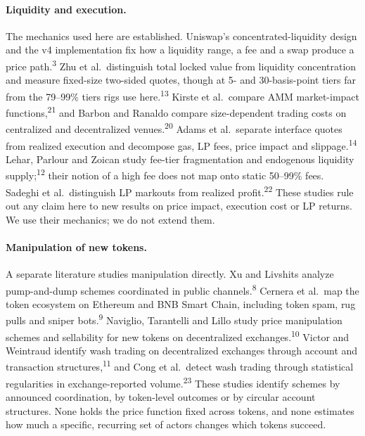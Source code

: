 \documentclass{ledger}
\newcommand{\n}[1]{\textsuperscript{#1}}
\begin{document}
\paragraph{Liquidity and execution.} The mechanics used here are established. Uniswap's concentrated-liquidity design and the v4 implementation fix how a liquidity range, a fee and a swap produce a price path.\n{3} Zhu et al.\ distinguish total locked value from liquidity concentration and measure fixed-size two-sided quotes, though at 5- and 30-basis-point tiers far from the 79--99\% tiers rigs use here.\n{13} Kirste et al.\ compare AMM market-impact functions,\n{21} and Barbon and Ranaldo compare size-dependent trading costs on centralized and decentralized venues.\n{20} Adams et al.\ separate interface quotes from realized execution and decompose gas, LP fees, price impact and slippage.\n{14} Lehar, Parlour and Zoican study fee-tier fragmentation and endogenous liquidity supply;\n{12} their notion of a high fee does not map onto static 50--99\% fees. Sadeghi et al.\ distinguish LP markouts from realized profit.\n{22} These studies rule out any claim here to new results on price impact, execution cost or LP returns. We use their mechanics; we do not extend them.

\paragraph{Manipulation of new tokens.} A separate literature studies manipulation directly. Xu and Livshits analyze pump-and-dump schemes coordinated in public channels.\n{8} Cernera et al.\ map the token ecosystem on Ethereum and BNB Smart Chain, including token spam, rug pulls and sniper bots.\n{9} Naviglio, Tarantelli and Lillo study price manipulation schemes and sellability for new tokens on decentralized exchanges.\n{10} Victor and Weintraud identify wash trading on decentralized exchanges through account and transaction structures,\n{11} and Cong et al.\ detect wash trading through statistical regularities in exchange-reported volume.\n{23} These studies identify schemes by announced coordination, by token-level outcomes or by circular account structures. None holds the price function fixed across tokens, and none estimates how much a specific, recurring set of actors changes which tokens succeed.
\end{document}
